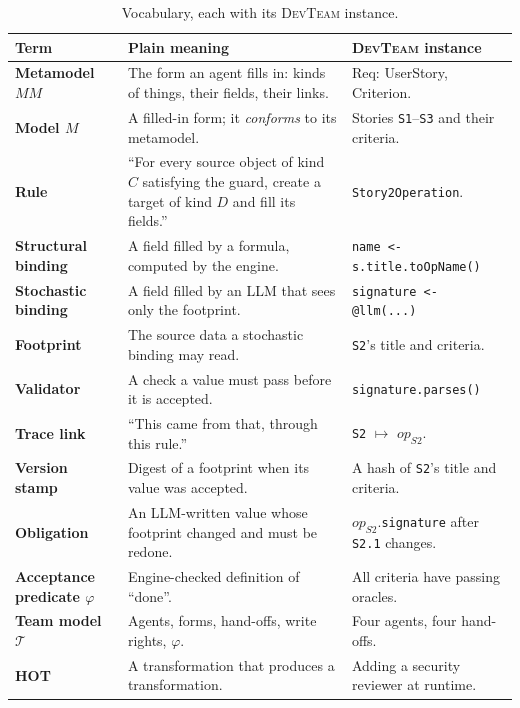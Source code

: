 \documentclass[10pt,a4paper]{article}
\newcommand{\devteam}{\textsc{DevTeam}}
\newcommand{\MM}{\mathit{MM}}
\newcommand{\team}{\mathcal{T}}
\newcommand{\cls}[1]{\textsf{#1}}
\newcommand{\code}[1]{\texttt{#1}}
\begin{document}
\begin{table}[!htb]
\centering\small
\caption{Vocabulary, each with its \devteam{} instance.}
\label{tab:glossary}
\begin{tabularx}{\textwidth}{@{}>{\bfseries}l X X@{}}
\toprule
\rowcolor{white}\normalfont Term & Plain meaning & \devteam{} instance \\
\midrule
Metamodel $\MM$ & The form an agent fills in: kinds of things, their fields, their links. & \cls{Req}: \cls{UserStory}, \cls{Criterion}. \\
Model $M$ & A filled-in form; it \emph{conforms} to its metamodel. & Stories \code{S1}--\code{S3} and their criteria. \\
Rule & ``For every source object of kind $C$ satisfying the guard, create a target of kind $D$ and fill its fields.'' & \code{Story2Operation}. \\
Structural binding & A field filled by a formula, computed by the engine. & \code{name <- s.title.toOpName()} \\
Stochastic binding & A field filled by an LLM that sees only the footprint. & \code{signature <- @llm(...)} \\
Footprint & The source data a stochastic binding may read. & \code{S2}'s title and criteria. \\
Validator & A check a value must pass before it is accepted. & \code{signature.parses()} \\
Trace link & ``This came from that, through this rule.'' & \code{S2} $\mapsto$ $\mathit{op}_{S2}$. \\
Version stamp & Digest of a footprint when its value was accepted. & A hash of \code{S2}'s title and criteria. \\
Obligation & An LLM-written value whose footprint changed and must be redone. & $\mathit{op}_{S2}$.\code{signature} after \code{S2.1} changes. \\
Acceptance predicate $\varphi$ & Engine-checked definition of ``done''. & All criteria have passing oracles. \\
Team model $\team$ & Agents, forms, hand-offs, write rights, $\varphi$. & Four agents, four hand-offs. \\
HOT & A transformation that produces a transformation. & Adding a security reviewer at runtime. \\
\bottomrule
\end{tabularx}
\end{table}
\end{document}

